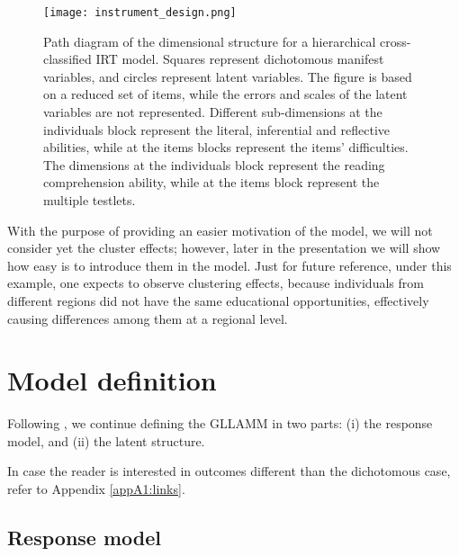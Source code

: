 \begin{figure}[h] \label{fig:design}
	\centering
	\texttt{[image: instrument\_design.png]}
	\caption[Path diagram of the dimensional structure for a hierarchical cross-classified IRT model.]%
	{Path diagram of the dimensional structure for a hierarchical cross-classified IRT model. Squares represent dichotomous manifest variables, and circles represent latent variables. The figure is based on a reduced set of items, while the errors and scales of the latent variables are not represented. Different sub-dimensions at the individuals block represent the literal, inferential and reflective abilities, while at the items blocks represent the items' difficulties. The dimensions at the individuals block represent the reading comprehension ability, while at the items block represent the multiple testlets.}
\end{figure}

With the purpose of providing an easier motivation of the model, we will not consider yet the cluster effects; however, later in the presentation we will show how easy is to introduce them in the model. Just for future reference, under this example, one expects to observe clustering effects, because individuals from different regions did not have the same educational opportunities, effectively causing differences among them at a regional level.


\section{Model definition} \label{sect:definition}

Following \citet{Rabe_et_al_2004a, Rabe_et_al_2004b}, we continue defining the GLLAMM in two parts: (i) the response model, and (ii) the latent structure.

In case the reader is interested in outcomes different than the dichotomous case, refer to Appendix \ref{appA1:links}.


\subsection{Response model} \label{s_sect:response}

